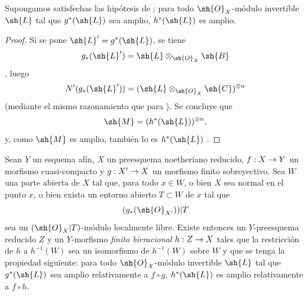 \documentclass[oneside,10pt]{amsart}
\makeatletter
\newcommand{\ega@arrow}[2]{\mathchoice{#1}{#2}{#2}{#2}}
\renewcommand{\to}{\ega@arrow{\longrightarrow}{\rightarrow}}
\let\EGAOriginalLabel\label
\renewcommand{\label}[1]{\phantomsection\EGAOriginalLabel{#1}}
\makeatother
\begin{document}
\begin{corollary}[6.6.10]
\label{II.6.6.10}
Supongamos satisfechas las hipótesis de ;
para todo $\sh{O}_X$-módulo invertible $\sh{L}$ tal que $g^*(\sh{L})$ sea amplio, $h^*(\sh{L})$ es amplio.
\end{corollary}

\begin{proof}
Si se pone $\sh{L}'=g^*(\sh{L})$, se tiene
\[
  g_*(\sh{L}')=\sh{L}\otimes_{\sh{O}_X}\sh{B}
\]
, luego
\[
  N'(g_*(\sh{L}'))=
  (\sh{L}\otimes_{\sh{O}_X}\sh{C})^{\otimes n}
\]
(mediante el mismo razonamiento que para ).
Se concluye que
\[
  \sh{M}=(h^*(\sh{L}))^{\otimes n},
\]
y, como $\sh{M}$ es amplio, también lo es $h^*(\sh{L})$ .
\end{proof}

\begin{proposition}[6.6.11]
\label{II.6.6.11}
Sean $Y$ un esquema afín, $X$ un preesquema noetheriano reducido, $f:X\to Y$ un morfismo cuasi-compacto y $g:X'\to X$ un morfismo finito sobreyectivo.
Sea $W$ una parte abierta de $X$ tal que, para todo $x\in W$, o bien $X$ sea normal en el punto $x$, o bien exista un entorno abierto $T\subset W$ de $x$ tal que
\[
  (g_*(\sh{O}_{X'}))|T
\]
sea un $(\sh{O}_X|T)$-módulo localmente libre.
Existe entonces un $Y$-preesquema reducido $Z$ y un $Y$-morfismo \emph{finito birracional} $h:Z\to X$ tales que la restricción de $h$ a $h^{-1}(W)$ sea un isomorfismo de $h^{-1}(W)$ sobre $W$ y que se tenga la propiedad siguiente: para todo $\sh{O}_X$-módulo invertible $\sh{L}$ tal que $g^*(\sh{L})$ sea amplio relativamente a $f\circ g$, $h^*(\sh{L})$ es amplio relativamente a $f\circ h$.
\end{proposition}
\end{document}
